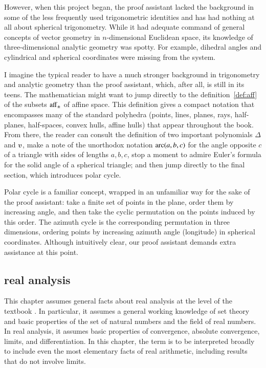 However, when this project began, the proof assistant lacked the
background in some of the less frequently used trigonometric
identities and has had nothing at all about spherical trigonometry.
While it had adequate command of general concepts of vector geometry
in $n$-dimensional Euclidean space, its knowledge of three-dimensional
analytic geometry was spotty.  For example, dihedral angles and
cylindrical and spherical coordinates were missing from the system.

I imagine the typical reader to have a much stronger background in
trigonometry and analytic geometry than the proof assistant, which,
after all, is still in its teens.  The mathematician might want to
jump directly to the definition~\ref{def:aff} of the subsets
${\operatorname{aff}}_\pm$ of affine space.  This definition gives a compact
notation that encompasses many of the standard polyhedra (points,
lines, planes, rays, half-planes, half-spaces, convex hulls, affine
hulls) that appear throughout the book.  From there, the reader can
consult the definition of two important polynomials $\Delta$ and
$\ups$, make a note of the unorthodox notation $\operatorname{arc}(a,b,c)$ for the
angle opposite $c$ of a triangle with sides of lengths $a,b,c$, stop a
moment to admire Euler's formula for the solid angle of a spherical
triangle; and then jump directly to the final section, which
introduces polar cycle.

Polar cycle is a familiar concept, wrapped in an unfamiliar way
for the sake of the proof assistant: take a finite set of points in
the plane, order them by increasing angle, and then take the cyclic
permutation on the points induced by this order.  The azimuth cycle
is the corresponding permutation in three dimensions, ordering points by
increasing azimuth angle (longitude) in spherical coordinates.
Although intuitively clear, our proof assistant demands extra
assistance at this point.



\subsection{real analysis}
\label{back:analysis}  
  This chapter assumes general facts about
  \hypertarget{back:analysis}{real analysis} at the level of the
  textbook \cite{unknown}. 
  In particular, it assumes a general working knowledge of set theory 
and basic properties of the set of natural numbers and the
  field of real numbers.  In real analysis, it assumes basic
  properties of convergence, absolute convergence, limits, and
  differentiation.  In this chapter, the term  is
  to be interpreted broadly to include even the most elementary facts
  of real arithmetic, including results that
  do not involve limits.


